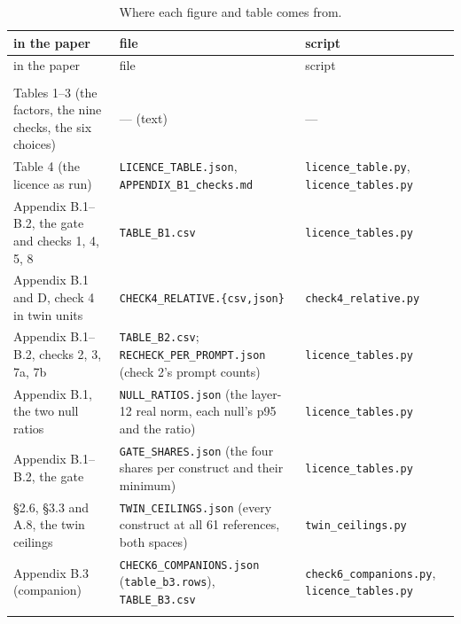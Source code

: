 \documentclass{article}
\begin{document}
\begingroup
\scriptsize
\renewcommand{\arraystretch}{1.25}
\setlength{\LTcapwidth}{\textwidth}
\renewcommand{\thetable}{D.1}
\begin{longtable}{@{}>{\raggedright\arraybackslash}p{0.3333\dimexpr\textwidth-4\tabcolsep\relax}>{\raggedright\arraybackslash}p{0.3333\dimexpr\textwidth-4\tabcolsep\relax}>{\raggedright\arraybackslash}p{0.3333\dimexpr\textwidth-4\tabcolsep\relax}@{}}
\caption{Where each figure and table comes from.}\label{tab:D.1}\\
\toprule
in the paper & file & script \\
\midrule
\endfirsthead
\toprule
in the paper & file & script \\
\midrule
\endhead
\midrule
\multicolumn{3}{r}{\itshape continued} \\
\endfoot
\bottomrule
\endlastfoot
Tables 1--3 (the factors, the nine checks, the six choices) & --- (text) & --- \\\addlinespace[2.5pt]
Table 4 (the licence as run) & \texttt{LICENCE\_TABLE.json}, \texttt{APPENDIX\_B1\_checks.md} & \texttt{licence\_table.py}, \texttt{licence\_tables.py} \\\addlinespace[2.5pt]
Appendix B.1--B.2, the gate and checks 1, 4, 5, 8 & \texttt{TABLE\_B1.csv} & \texttt{licence\_tables.py} \\\addlinespace[2.5pt]
Appendix B.1 and D, check 4 in twin units & \texttt{CHECK4\_RELATIVE.\{csv,json\}} & \texttt{check4\_relative.py} \\\addlinespace[2.5pt]
Appendix B.1--B.2, checks 2, 3, 7a, 7b & \texttt{TABLE\_B2.csv}; \texttt{RECHECK\_PER\_PROMPT.json} (check 2's prompt counts) & \texttt{licence\_tables.py} \\\addlinespace[2.5pt]
Appendix B.1, the two null ratios & \texttt{NULL\_RATIOS.json} (the layer-12 real norm, each null's p95 and the ratio) & \texttt{licence\_tables.py} \\\addlinespace[2.5pt]
Appendix B.1--B.2, the gate & \texttt{GATE\_SHARES.json} (the four shares per construct and their minimum) & \texttt{licence\_tables.py} \\\addlinespace[2.5pt]
\S2.6, \S3.3 and A.8, the twin ceilings & \texttt{TWIN\_CEILINGS.json} (every construct at all 61 references, both spaces) & \texttt{twin\_ceilings.py} \\\addlinespace[2.5pt]
Appendix B.3 (companion) & \texttt{CHECK6\_COMPANIONS.json} (\texttt{table\_b3.rows}), \texttt{TABLE\_B3.csv} & \texttt{check6\_companions.py}, \texttt{licence\_tables.py} \\\addlinespace[2.5pt]

\end{longtable}
\end{document}

